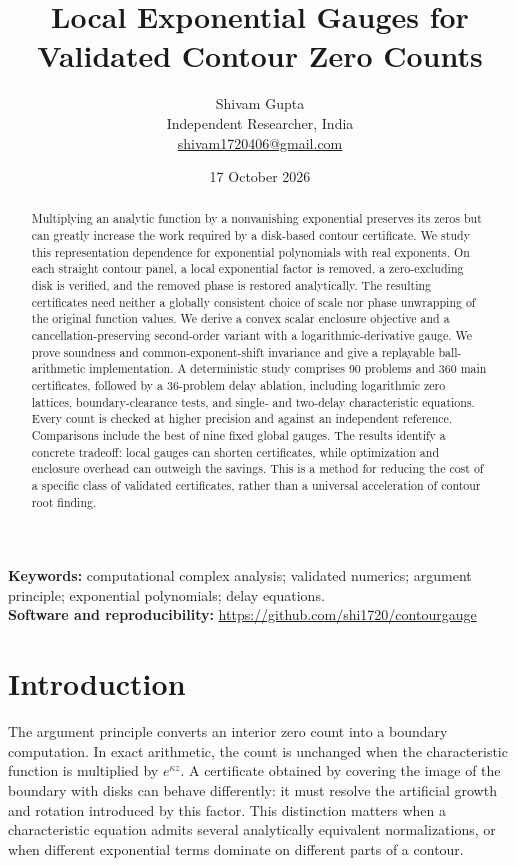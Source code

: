 \documentclass[11pt,a4paper]{article}
\title{Local Exponential Gauges for\\Validated Contour Zero Counts}
\author{Shivam Gupta\\\small Independent Researcher, India\\
\small\href{mailto:shivam1720406@gmail.com}{shivam1720406@gmail.com}}
\date{17 October 2026}
\begin{document}
\maketitle
\begin{abstract}
Multiplying an analytic function by a nonvanishing exponential preserves its zeros but can greatly increase the work required by a disk-based contour certificate. We study this representation dependence for exponential polynomials with real exponents. On each straight contour panel, a local exponential factor is removed, a zero-excluding disk is verified, and the removed phase is restored analytically. The resulting certificates need neither a globally consistent choice of scale nor phase unwrapping of the original function values. We derive a convex scalar enclosure objective and a cancellation-preserving second-order variant with a logarithmic-derivative gauge. We prove soundness and common-exponent-shift invariance and give a replayable ball-arithmetic implementation. A deterministic study comprises 90 problems and 360 main certificates, followed by a 36-problem delay ablation, including logarithmic zero lattices, boundary-clearance tests, and single- and two-delay characteristic equations. Every count is checked at higher precision and against an independent reference. Comparisons include the best of nine fixed global gauges. The results identify a concrete tradeoff: local gauges can shorten certificates, while optimization and enclosure overhead can outweigh the savings. This is a method for reducing the cost of a specific class of validated certificates, rather than a universal acceleration of contour root finding.
\end{abstract}
\noindent\textbf{Keywords:} computational complex analysis; validated numerics; argument principle; exponential polynomials; delay equations.\\
\textbf{Software and reproducibility:} \url{https://github.com/shi1720/contourgauge}

\section{Introduction}
The argument principle converts an interior zero count into a boundary computation. In exact arithmetic, the count is unchanged when the characteristic function is multiplied by $e^{\kappa z}$. A certificate obtained by covering the image of the boundary with disks can behave differently: it must resolve the artificial growth and rotation introduced by this factor. This distinction matters when a characteristic equation admits several analytically equivalent normalizations, or when different exponential terms dominate on different parts of a contour.
\end{document}

